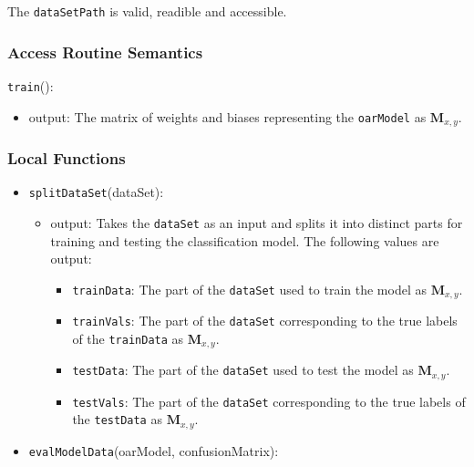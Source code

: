 \documentclass[12pt, titlepage]{article}
\def\code#1{\texttt{#1}}
\begin{document}
The \code{dataSetPath} is valid, readible and accessible.

\subsubsection{Access Routine Semantics}

\noindent \code{train}():
\begin{itemize}
\item output: The matrix of weights and biases representing the \code{oarModel} as $\mathbf{M}_{x,y}$.
\end{itemize}

\subsubsection{Local Functions}

\begin{itemize}
\item \code{splitDataSet}(dataSet):
  \begin{itemize}
    \item output: Takes the \code{dataSet} as an input and splits it into distinct parts for training and testing the classification model.
    The following values are output:
    \begin{itemize}
      \item \code{trainData}: The part of the \code{dataSet} used to train the model as $\mathbf{M}_{x,y}$.
      \item \code{trainVals}: The part of the \code{dataSet} corresponding to the true labels of the \code{trainData} as $\mathbf{M}_{x,y}$.
      \item \code{testData}: The part of the \code{dataSet} used to test the model as $\mathbf{M}_{x,y}$.
      \item \code{testVals}: The part of the \code{dataSet} corresponding to the true labels of the \code{testData} as $\mathbf{M}_{x,y}$.
    \end{itemize}
  \end{itemize}
\item \code{evalModelData}(oarModel, confusionMatrix):
\end{itemize}
\end{document}
